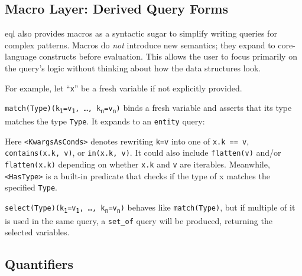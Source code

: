 \documentclass{article}
\begin{document}
\subsection{Macro Layer: Derived Query Forms}

\ac{eql} also provides macros as a syntactic sugar to simplify writing queries for complex patterns.   
Macros do \emph{not} introduce new semantics; they expand to core-language constructs
before evaluation. This allows the user to focus primarily on the query's logic without thinking about how the data structures look.

For example, let ``\texttt{x}'' be a fresh variable if not explicitly provided.


\texttt{match(Type)(k\textsubscript{1}=v\textsubscript{1}, …, k\textsubscript{n}=v\textsubscript{n})} binds a fresh variable and asserts that its type matches the type \texttt{Type}.  
It expands to an \texttt{entity} query:


Here \texttt{<KwargsAsConds>} denotes rewriting \texttt{k=v} into one of \texttt{x.k == v}, \texttt{contains(x.k, v)}, or \texttt{in(x.k, v)}. It could also include \texttt{flatten(v)} and/or \texttt{flatten(x.k)} depending on whether \texttt{x.k} and \texttt{v} are iterables. Meanwhile, \texttt{<HasType>} is a built-in predicate that checks if the type of x matches the specified \texttt{Type}.


\texttt{select(Type)(k\textsubscript{1}=v\textsubscript{1}, …, k\textsubscript{n}=v\textsubscript{n})} behaves like \texttt{match(Type)}, but if multiple of it is used in the same query, a \texttt{set\_of} query will be produced, returning the selected variables.


\subsection{Quantifiers}
\end{document}
